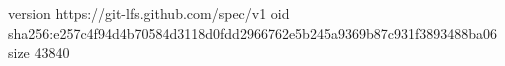 version https://git-lfs.github.com/spec/v1
oid sha256:e257c4f94d4b70584d3118d0fdd2966762e5b245a9369b87c931f3893488ba06
size 43840
